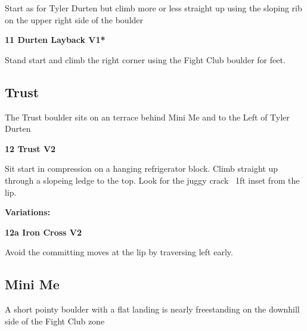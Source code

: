 \begin{multicols}{2}
					\begin{adjustwidth}{0.5cm}{}				
					Start as for Tyler Durten but climb more or less straight up using the sloping rib on the upper right side of the boulder
					\end{adjustwidth}
					\label{rt:Durten Layback}
\colorbox{green!20}{
\parbox{0.95\linewidth}{
\textbf{
11 Durten Layback V1*  
}
}
}

					\begin{adjustwidth}{0.5cm}{}				
					Stand start and climb the right corner using the Fight Club boulder for feet.
					\end{adjustwidth}
			\subsection*{Trust}\label{bf:Trust}
			The Trust boulder sits on an terrace behind Mini Me and to the Left of Tyler Durten\\
			

					\label{rt:Trust}
\colorbox{green!20}{
\parbox{0.95\linewidth}{
\textbf{
12 Trust V2  
}
}
}

					\begin{adjustwidth}{0.5cm}{}				
					Sit start in compression on a hanging refrigerator block. Climb straight up through a slopeing ledge to the top. Look for the juggy crack ~1ft inset from the lip.
					\end{adjustwidth}
						\begin{adjustwidth}{0.5cm}{}				
						\textbf{Variations:} \newline
							\label{vr:Iron Cross}
\colorbox{green!20}{
\parbox{0.95\linewidth}{
\textbf{
12a Iron Cross V2  
}
}
}

							\begin{adjustwidth}{0.5cm}{}				
							Avoid the committing moves at the lip by traversing left early.
							\end{adjustwidth}
						\end{adjustwidth}
			\subsection*{Mini Me}\label{bf:Mini Me}
			A short pointy boulder with a flat landing is nearly freestanding on the downhill side of the Fight Club zone\\
			

\end{multicols}

